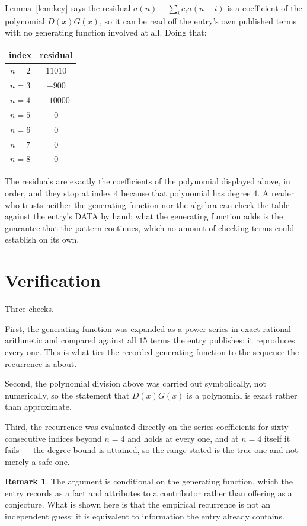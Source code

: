 \documentclass[11pt,a4paper]{article}
\theoremstyle{plain}
\theoremstyle{definition}
\newtheorem{remark}[theorem]{Remark}
\begin{document}
Lemma~\ref{lem:key} says the residual $a(n)-\sum_ic_ia(n-i)$ is a coefficient of the
polynomial $D(x)G(x)$, so it can be read off the entry's own published terms with no
generating function involved at all. Doing that:
\begin{center}
\begin{tabular}{cc}
index & residual \\ \hline
$n=2$ & $11010$ \\
$n=3$ & $-900$ \\
$n=4$ & $-10000$ \\
$n=5$ & $0$ \\
$n=6$ & $0$ \\
$n=7$ & $0$ \\
$n=8$ & $0$
\end{tabular}
\end{center}
The residuals are exactly the coefficients of the polynomial displayed above, in order, and
they stop at index $4$ because that polynomial has degree $4$. A reader who trusts
neither the generating function nor the algebra can check the table against the entry's DATA
by hand; what the generating function adds is the guarantee that the pattern continues, which
no amount of checking terms could establish on its own.

\section{Verification}

Three checks.

First, the generating function was expanded as a power series in exact rational arithmetic and
compared against all $15$ terms the entry publishes: it reproduces every one. This is
what ties the recorded generating function to the sequence the recurrence is about.

Second, the polynomial division above was carried out symbolically, not numerically, so the
statement that $D(x)G(x)$ is a polynomial is exact rather than approximate.

Third, the recurrence was evaluated directly on the series coefficients for sixty consecutive
indices beyond $n=4$ and holds at every one, and at $n=4$ itself it fails --- the
degree bound is attained, so the range stated is the true one and not merely a safe one.

\begin{remark}
The argument is conditional on the generating function, which the entry records as a fact and
attributes to a contributor rather than offering as a conjecture. What is shown here is that
the empirical recurrence is not an independent guess: it is equivalent to information the
entry already contains.
\end{remark}
\end{document}
